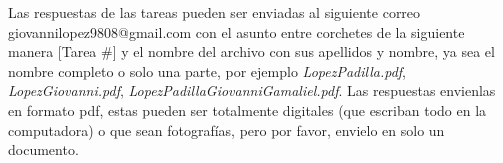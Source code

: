 \documentclass[12pt,letterpaper]{report}
\begin{document}
Las respuestas de las tareas pueden ser enviadas al siguiente correo giovannilopez9808@gmail.com con el asunto entre corchetes de la siguiente manera [Tarea \#] y el nombre del archivo con sus apellidos y nombre, ya sea el nombre completo o solo una parte, por ejemplo \textit{LopezPadilla.pdf}, \textit{LopezGiovanni.pdf}, \textit{LopezPadillaGiovanniGamaliel.pdf}. Las respuestas envienlas en formato pdf, estas pueden ser totalmente digitales (que escriban todo en la computadora) o que sean fotografías, pero por favor, envielo en solo un documento.
\end{document}
